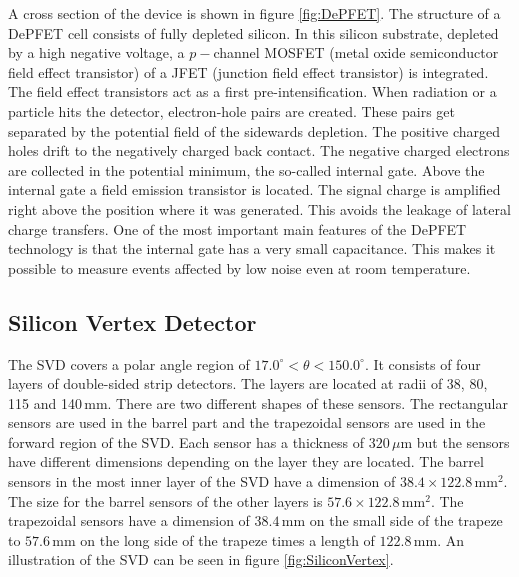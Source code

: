 \documentclass[a4paper,11pt,twosided,final,german,openbib,pdftex,listof=totoc,bibliography=totoc]{scrbook}
\begin{document}
A cross section of the device is shown in figure \ref{fig:DePFET}. The structure of a DePFET cell consists of fully depleted silicon. In this silicon substrate, depleted by a high negative voltage, a $p-$channel MOSFET (metal oxide semiconductor field effect transistor) of a JFET (junction field effect transistor) is integrated. The field effect transistors act as a first pre-intensification. When radiation or a particle hits the detector, electron-hole pairs are created. These pairs get separated by the potential field of the sidewards depletion. The positive charged holes drift to the negatively charged back contact. The negative charged electrons are collected in the potential minimum, the so-called internal gate. Above the internal gate a field emission transistor is located. The signal charge is amplified right above the position where it was generated. This avoids the leakage of lateral charge transfers. One of the most important main features of the DePFET technology is that the internal gate has a very small capacitance. This makes it possible to measure events affected by low noise even at room temperature.\cite{B2TR}

\subsection{Silicon Vertex Detector}
\label{sec:Silicon}
The SVD covers a polar angle region of $17.0^{\circ} < \theta < 150.0^{\circ}$. It consists of four layers of double-sided strip detectors. The layers are located at radii of 38, 80, 115 and 140$\,\textrm{mm}$. There are two different shapes of these sensors. The rectangular sensors are used in the barrel part and the trapezoidal sensors are used in the forward region of the SVD. Each sensor has a thickness of $320\,\mu\textrm{m}$ but the sensors have different dimensions depending on the layer they are located. The barrel sensors in the most inner layer of the SVD have a dimension of $38.4 \times 122.8\,\textrm{mm}^2$. The size for the barrel sensors of the other layers is $57.6 \times 122.8\,\textrm{mm}^2$. The trapezoidal sensors have a dimension of $38.4\,\textrm{mm}$ on the small side of the trapeze to $57.6\,\textrm{mm}$ on the long side of the trapeze times a length of $122.8\,\textrm{mm}$.\cite{B2TR} An illustration of the SVD can be seen in figure \ref{fig:SiliconVertex}. 
\end{document}
